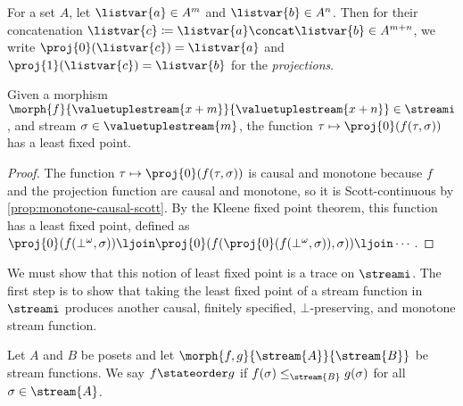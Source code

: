 \documentclass{lmcs}
\begin{document}
\begin{nota}[Projection]
    For a set \(A\), let \(\listvar{a} \in A^m\) and \(\listvar{b} \in A^n\).
    Then for their concatenation \(
    \listvar{c} \coloneqq \listvar{a} \concat \listvar{b} \in A^{m+n}\),
    we write \(\proj{0}(\listvar{c}) = \listvar{a}\) and
    \(\proj{1}(\listvar{c}) = \listvar{b}\) for the \emph{projections}.
\end{nota}

\begin{lem}\label{lem:lfp-stream-function}
    Given a morphism \(
    \morph{f}{\valuetuplestream{x+m}}{\valuetuplestream{x+n}}
    \in \streami
    \), and stream \(\sigma \in \valuetuplestream{m}\), the function \(
    \tau \mapsto \proj{0}\mleft(f(\tau,\sigma)\mright)
    \) has a least fixed point.
\end{lem}
\begin{proof}
    The function \(\tau \mapsto \proj{0}\mleft(f(\tau,\sigma)\mright)\) is
    causal and monotone because \(f\) and the projection function are
    causal and monotone, so it is Scott-continuous by
    \cref{prop:monotone-causal-scott}.
    By the Kleene fixed point theorem, this function has a least fixed point,
    defined as \(
    \proj{0}\mleft(f(\bot^\omega, \sigma)\mright) \ljoin
    \proj{0}\mleft(f(\proj{0}\mleft(f(\bot^\omega, \sigma)\mright), \sigma)\mright) \ljoin
    \cdots
    \).
\end{proof}

We must show that this notion of least fixed point is a trace on \(\streami\).
The first step is to show that taking the least fixed point of a stream function
in \(\streami\) produces another causal, finitely specified,
\(\bot\)-preserving, and monotone stream function.

\begin{defi}\label{def:state-order}
    Let \(A\) and \(B\) be posets and let
    \(\morph{f, g}{\stream{A}}{\stream{B}}\) be stream functions.
    We say \(f \stateorder g\) if \(f(\sigma) \leq_{\stream{B}} g(\sigma)\)
    for all \(\sigma \in \stream{A}\).
\end{defi}
\end{document}
